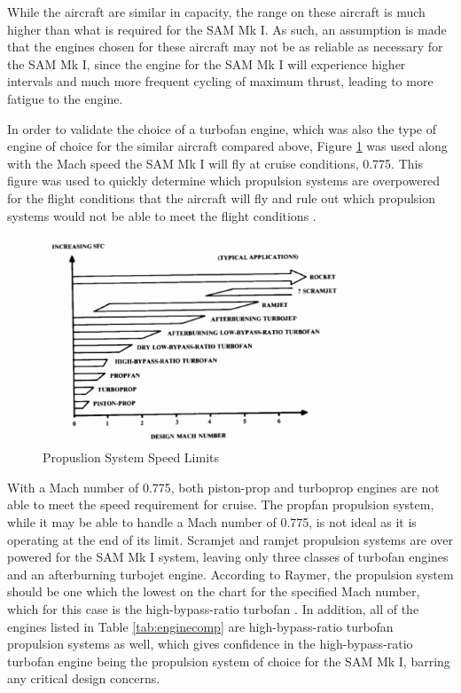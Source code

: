 While the aircraft are similar in capacity, the range on these aircraft is much higher than what is required for the SAM Mk I. As such, an assumption is made that the engines chosen for these aircraft may not be as reliable as necessary for the SAM Mk I, since the engine for the SAM Mk I will experience higher intervals and much more frequent cycling of maximum thrust, leading to more fatigue to the engine. 

In order to validate the choice of a turbofan engine, which was also the type of engine of choice for the similar aircraft compared above, Figure \ref{PropSelection} was used along with the Mach speed the SAM Mk I will fly at cruise conditions, 0.775. This figure was used to quickly determine which propulsion systems are overpowered for the flight conditions that the aircraft will fly and rule out which propulsion systems would not be able to meet the flight conditions \cite{raymer}.

\begin{figure} [h!]
    \centering
    \includegraphics[width=0.8\textwidth]{Photos/PropSelection.PNG}
    \caption{Propuslion System Speed Limits}
    \label{PropSelection}
\end{figure}

\newpage
With a Mach number of 0.775, both piston-prop and turboprop engines are not able to meet the speed requirement for cruise. The propfan propulsion system, while it may be able to handle a Mach number of 0.775, is not ideal as it is operating at the end of its limit. Scramjet and ramjet propulsion systems are over powered for the SAM Mk I system, leaving only three classes of turbofan engines and an afterburning turbojet engine. According to Raymer, the propulsion system should be one which the lowest on the chart for the specified Mach number, which for this case is the high-bypass-ratio turbofan \cite{raymer}. In addition, all of the engines listed in Table \ref{tab:enginecomp} are high-bypass-ratio turbofan propulsion systems as well, which gives confidence in the high-bypass-ratio turbofan engine being the propulsion system of choice for the SAM Mk I, barring any critical design concerns.

